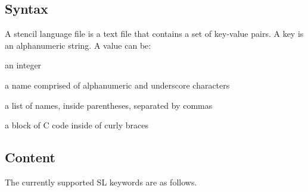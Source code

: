 \documentclass[preprint,nocopyrightspace]{styles/sigplanconf}
\begin{document}
\subsection{Syntax}

A stencil language file is a text file that
contains a set of key-value pairs.
A key is an alphanumeric string.  A value can be:
\begin{itemize*}
\item an integer
\item a name comprised of alphanumeric and underscore characters
\item a list of names, inside parentheses, separated by commas
\item a block of C code inside of curly braces
\end{itemize*}

\subsection{Content}

The currently supported SL keywords are as follows.
\end{document}
